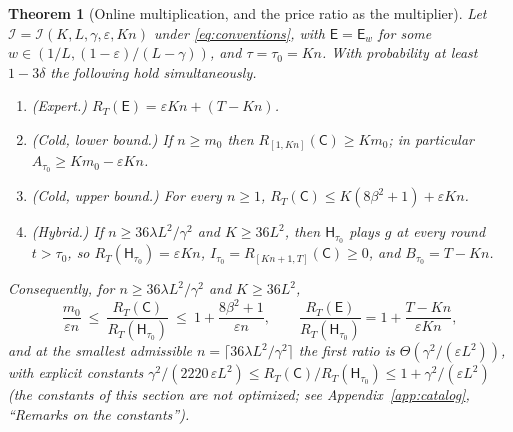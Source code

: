\documentclass{article}
\newtheorem{theorem}{Theorem}
\theoremstyle{definition}
\theoremstyle{remark}
\newcommand{\eps}{\varepsilon}
\theoremstyle{remark}
\newcommand{\Cold}{\mathsf{C}}
\newcommand{\Exp}{\mathsf{E}}
\newcommand{\Hyb}{\mathsf{H}}
\begin{document}
\begin{theorem}[Online multiplication, and the price ratio as the multiplier]
\label{thm:price}
Let $\mathcal I=\mathcal I(K,L,\gamma,\eps,Kn)$ under \eqref{eq:conventions}, with
$\Exp=\Exp_w$ for some $w\in(1/L,(1-\eps)/(L-\gamma))$, and $\tau=\tau_0=Kn$. With
probability at least $1-3\delta$ the following hold simultaneously.
\begin{enumerate}[itemsep=1pt,topsep=1pt,leftmargin=*]
\item[(i)] \emph{(Expert.)} $R_T(\Exp)=\eps Kn+(T-Kn)$.
\item[(ii)] \emph{(Cold, lower bound.)} If $n\ge m_0$ then
$R_{[1,Kn]}(\Cold)\ge Km_0$; in particular $A_{\tau_0}\ge Km_0-\eps Kn$.
\item[(iii)] \emph{(Cold, upper bound.)} For every $n\ge1$, $R_T(\Cold)\le K(8\beta^2+1)+\eps Kn$.
\item[(iv)] \emph{(Hybrid.)} If $n\ge36\lambda L^2/\gamma^2$ and $K\ge36L^2$, then
$\Hyb_{\tau_0}$ plays $g$ at every round $t>\tau_0$, so
$R_T(\Hyb_{\tau_0})=\eps Kn$, $I_{\tau_0}=R_{[Kn+1,T]}(\Cold)\ge0$, and
$B_{\tau_0}=T-Kn$.
\end{enumerate}
Consequently, for $n\ge36\lambda L^2/\gamma^2$ and $K\ge36L^2$,
\begin{equation}
\label{eq:price-ratio}
\frac{m_0}{\eps n}\ \le\ \frac{R_T(\Cold)}{R_T(\Hyb_{\tau_0})}\ \le\ 1+\frac{8\beta^2+1}{\eps n},
\qquad
\frac{R_T(\Exp)}{R_T(\Hyb_{\tau_0})}=1+\frac{T-Kn}{\eps Kn},
\end{equation}
and at the smallest admissible $n=\lceil36\lambda L^2/\gamma^2\rceil$ the first
ratio is $\Theta(\gamma^2/(\eps L^2))$, with explicit constants
$\gamma^2/(2220\,\eps L^2)\le R_T(\Cold)/R_T(\Hyb_{\tau_0})\le1+\gamma^2/(\eps L^2)$
(the constants of this section are not optimized; see
Appendix~\ref{app:catalog}, ``Remarks on the constants'').
\end{theorem}
\end{document}
